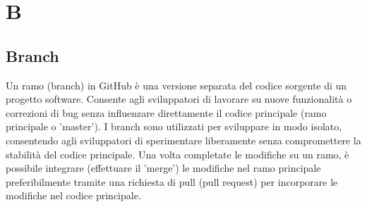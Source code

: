 \section{B} 
\subsection{Branch} 
Un ramo (branch) in GitHub è una versione separata del codice sorgente di un progetto software. Consente agli sviluppatori di lavorare su nuove funzionalità o correzioni di bug senza influenzare direttamente il codice principale (ramo principale o 'master'). I branch sono utilizzati per sviluppare in modo isolato, consentendo agli sviluppatori di sperimentare liberamente senza compromettere la stabilità del codice principale. Una volta completate le modifiche su un ramo, è possibile integrare (effettuare il 'merge') le modifiche nel ramo principale preferibilmente tramite una richiesta di pull (pull request) per incorporare le modifiche nel codice principale.
